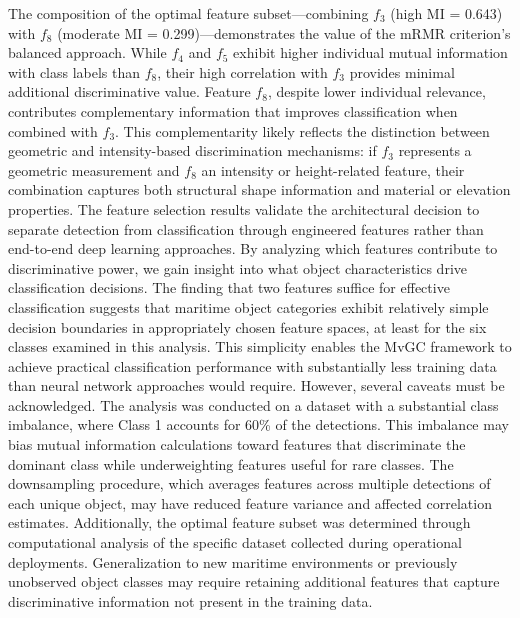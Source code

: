 \documentclass{erauthesis}
\begin{document}
The composition of the optimal feature subset—combining $f_3$ (high MI = 0.643) with $f_8$ (moderate MI = 0.299)—demonstrates the value of the mRMR criterion's balanced approach. While $f_4$ and $f_5$ exhibit higher individual mutual information with class labels than $f_8$, their high correlation with $f_3$ provides minimal additional discriminative value. Feature $f_8$, despite lower individual relevance, contributes complementary information that improves classification when combined with $f_3$. This complementarity likely reflects the distinction between geometric and intensity-based discrimination mechanisms: if $f_3$ represents a geometric measurement and $f_8$ an intensity or height-related feature, their combination captures both structural shape information and material or elevation properties.
The feature selection results validate the architectural decision to separate detection from classification through engineered features rather than end-to-end deep learning approaches. By analyzing which features contribute to discriminative power, we gain insight into what object characteristics drive classification decisions. The finding that two features suffice for effective classification suggests that maritime object categories exhibit relatively simple decision boundaries in appropriately chosen feature spaces, at least for the six classes examined in this analysis. This simplicity enables the MvGC framework to achieve practical classification performance with substantially less training data than neural network approaches would require.
However, several caveats must be acknowledged. The analysis was conducted on a dataset with a substantial class imbalance, where Class 1 accounts for 60\% of the detections. This imbalance may bias mutual information calculations toward features that discriminate the dominant class while underweighting features useful for rare classes. The downsampling procedure, which averages features across multiple detections of each unique object, may have reduced feature variance and affected correlation estimates. Additionally, the optimal feature subset was determined through computational analysis of the specific dataset collected during operational deployments. Generalization to new maritime environments or previously unobserved object classes may require retaining additional features that capture discriminative information not present in the training data.
\end{document}

